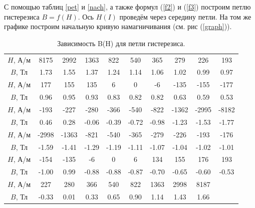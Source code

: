 \documentclass[a4paper, 12pt, twoside]{article}
\begin{document}
С помощью таблиц \ref{pet} и \ref{nach}, а также формул (\ref{f2}) и (\ref{f3})
построим петлю гистерезиса $B = f(H)$. Ось $H(I)$ проведём через середину петли. На том же графике построим начальную кривую намагничивания (см. рис (\ref{graph})).

\begin{table}[H]
	\centering
	\caption{Зависимость B(H) для петли гистерезиса.}
	\label{zavg}
	\begin{tabular}{c|c|c|c|c|c|c|c|c|c}
		\toprule
		$H$, А/м & 8175  & 2992  & 1363  & 822   & 540   & 365   & 279   & 226   & \multicolumn{1}{c}{193}   \\ 
		$B$, Тл  & 1.73  & 1.55  & 1.37  & 1.24  & 1.14  & 1.06  & 1.02  & 0.99  & \multicolumn{1}{c}{0.97}  \\ \midrule
		$H$, А/м & 177   & 155   & 135   & 6     & 0     & -6    & -135  & -155  & \multicolumn{1}{c}{-177}  \\ 
		$B$, Тл  & 0.96  & 0.95  & 0.93  & 0.83  & 0.82  & 0.82  & 0.63  & 0.59  & \multicolumn{1}{c}{0.53}  \\ \midrule
		$H$, А/м & -193  & -227  & -280  & -366  & -540  & -822  & -1362 & -2995 & \multicolumn{1}{c}{-8182} \\ 
		$B$, Тл  & 0.46  & 0.28  & -0.06 & -0.39 & -0.72 & -0.98 & -1.23 & -1.53 & \multicolumn{1}{c}{-1.77} \\ \midrule
		$H$, А/м & -2998 & -1363 & -821  & -540  & -365  & -279  & -226  & -193  & \multicolumn{1}{c}{-176}  \\ 
		$B$, Тл  & -1.59 & -1.41 & -1.29 & -1.19 & -1.11 & -1.07 & -1.04 & -1.02 & \multicolumn{1}{c}{-1.01} \\ \midrule
		$H$, А/м & -154  & -135  & -6    & 0     & 6     & 134   & 155   & 176   & \multicolumn{1}{c}{193}   \\ 
		$B$, Тл  & -1.00 & 0.99  & -0.88 & -0.88 & -0.87 & -0.70 & -0.65 & -0.60 & \multicolumn{1}{c}{-0.53} \\ \midrule
		$H$, А/м & 227   & 280   & 366   & 540   & 822   & 1363  & 2998  & 8187  &                            \\ 
		$B$, Тл  & -0.33 & 0.01  & 0.33  & 0.65  & 0.90  & 1.14  & 1.43  & 1.66  &                            \\ \bottomrule
	\end{tabular}
\end{table}
\end{document}
